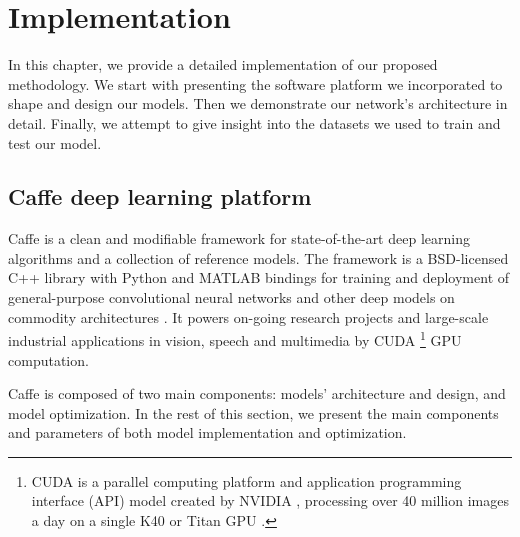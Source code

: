 
\chapter{Implementation}
\label{sec:implementation}
\noindent

\noindent In this chapter, we provide a detailed implementation of our proposed methodology. We start with presenting the software platform we incorporated to shape and design our models. Then we demonstrate our network's architecture in detail. Finally, we attempt to give insight into the datasets we used to train and test our model. 

\section{Caffe deep learning platform}

Caffe is a clean and modifiable framework for state-of-the-art deep learning algorithms and a collection of reference models. The framework is a BSD-licensed C++ library with Python and MATLAB bindings for training and deployment of general-purpose convolutional neural networks and other deep models on commodity architectures \cite{jia2014caffe}. It powers on-going research projects and large-scale industrial applications in vision, speech and multimedia by CUDA \footnote{CUDA is a parallel computing platform and application programming interface (API) model created by NVIDIA \cite{cuda}, processing over 40 million images a day on a single K40 or Titan GPU \cite{jia2014caffe}.}  GPU computation.

Caffe is composed of two main components: models' architecture and design, and model optimization. In the rest of this section, we present the main components and parameters of both model implementation and optimization.
